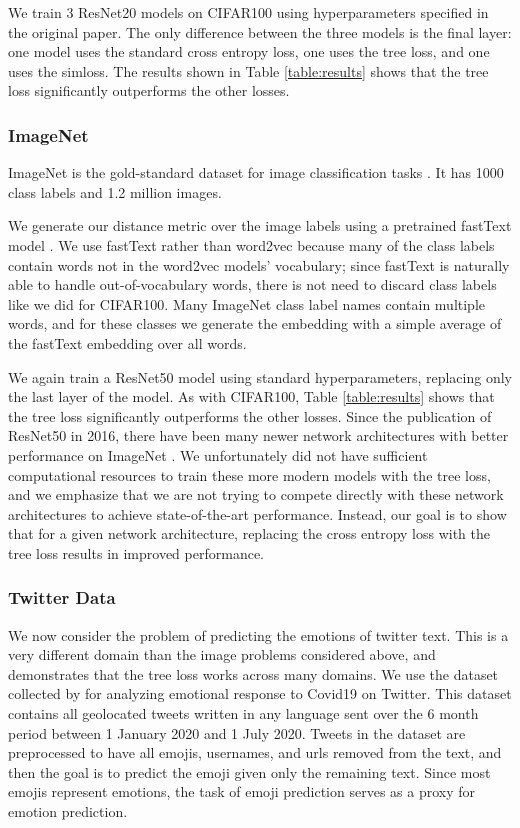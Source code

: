 \documentclass[twoside]{article}
\begin{document}
We train 3 ResNet20 models on CIFAR100 \citep{He2016DeepRL} using hyperparameters specified in the original paper.
The only difference between the three models is the final layer:
one model uses the standard cross entropy loss, one uses the tree loss, and one uses the simloss.
The results shown in Table \ref{table:results} shows that the tree loss significantly outperforms the other losses.

\subsubsection{ImageNet}

ImageNet is the gold-standard dataset for image classification tasks \citep{Russakovsky2015ImageNetLS}.
It has 1000 class labels and 1.2 million images.

We generate our distance metric over the image labels using a pretrained fastText model \citep{bojanowski2017enriching}.
We use fastText rather than word2vec because many of the class labels contain words not in the word2vec models' vocabulary;
since fastText is naturally able to handle out-of-vocabulary words,
there is not need to discard class labels like we did for CIFAR100.
Many ImageNet class label names contain multiple words,
and for these classes we generate the embedding with a simple average of the fastText embedding over all words.

We again train a ResNet50 model \citep{He2016DeepRL} using standard hyperparameters, replacing only the last layer of the model.
As with CIFAR100, Table \ref{table:results} shows that the tree loss significantly outperforms the other losses.
Since the publication of ResNet50 in 2016,
there have been many newer network architectures with better performance on ImageNet \citep[e.g.][]{howard2017mobilenets,huang2017densely,pmlr-v97-tan19a}.
We unfortunately did not have sufficient computational resources to train these more modern models with the tree loss,
and we emphasize that we are not trying to compete directly with these network architectures to achieve state-of-the-art performance.
Instead, our goal is to show that for a given network architecture,
replacing the cross entropy loss with the tree loss results in improved performance.

\subsubsection{Twitter Data}

We now consider the problem of predicting the emotions of twitter text.
This is a very different domain than the image problems considered above,
and demonstrates that the tree loss works across many domains.
We use the dataset collected by \citep{stoikos2020multilingual} for analyzing emotional response to Covid19 on Twitter.
This dataset contains all geolocated tweets written in any language sent over the 6 month period between 1 January 2020 and 1 July 2020.
Tweets in the dataset are preprocessed to have all emojis, usernames, and urls removed from the text,
and then the goal is to predict the emoji given only the remaining text.
Since most emojis represent emotions,
the task of emoji prediction serves as a proxy for emotion prediction.
\end{document}
